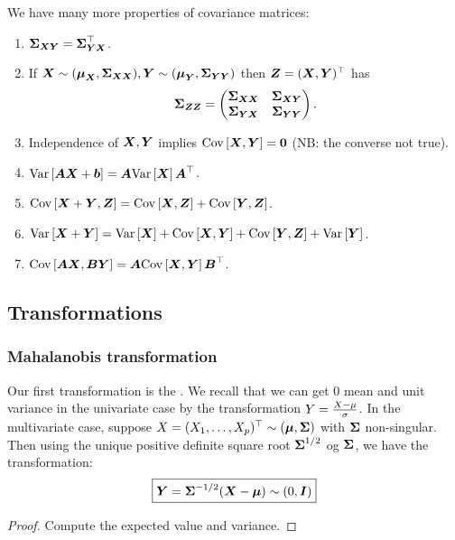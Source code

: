 We have many more properties of covariance matrices:
\begin{enumerate}
    \item $\SS_{\X\Y} = \SS_{\Y\X}^\top$.
    \item If $\X\sim(\M_{\X}, \SS_{\X\X}), \Y\sim(\M_{\Y}, \SS_{\Y\Y})$ then $\Z=(\X,\Y)^\top$ has
    $$
        \SS_{\Z\Z} = \begin{pmatrix}
            \SS_{\X\X} & \SS_{\X\Y} \\ \SS_{\Y\X} & \SS_{\Y\Y}
        \end{pmatrix}.
    $$
    \item Independence of $\X,\Y$ implies $\cov{\X,\Y}=\zero$ (NB: the converse not true).
    \item $\var{\mA\X+\boldsymbol{b}} = \mA \var{\X}\mA^\top$.
    \item $\cov{\X+\Y, \Z} = \cov{\X, \Z} + \cov{\Y, \Z}$.
    \item $\var{\X+\Y} = \var{\X} + \cov{\X, \Y} + \cov{\Y, \Z} + \var{\Y}$.
    \item $\cov{\mA\X, \mB\Y} = \mA\cov{\X, \Y}\mB^\top$.
\end{enumerate}

\subsection{Transformations}
\subsubsection{Mahalanobis transformation}

Our first transformation is the . We recall that we can get 0 mean and unit variance in the univariate case by the transformation $Y=\frac{X-\mu}{\s}$. In the multivariate case, suppose $X=(X_1,\dots, X_p)^\top\sim (\M, \SS)$ with $\SS$ non-singular. Then using the unique positive definite square root $\SS^{1/2}$ og $\SS$, we have the transformation:
\begin{equation}
    \boxed{\Y=\SS^{-1/2}(\X-\M) \sim (0, \mI)}
\end{equation}
\begin{proof}
    Compute the expected value and variance.
\end{proof}

